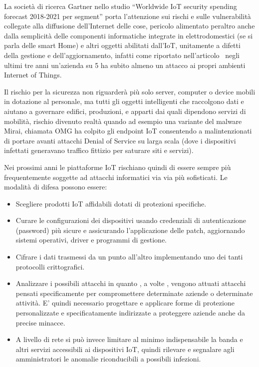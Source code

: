 La società di ricerca Gartner nello studio “Worldwide IoT security spending forecast 2018-2021 per segment” porta l’attenzione sui rischi e sulle vulnerabilità 
collegate alla diffusione dell’Internet delle cose, pericolo alimentato peraltro anche dalla semplicità delle componenti informatiche integrate in elettrodomestici (se
si parla delle smart Home) e altri oggetti abilitati dall’IoT, unitamente a difetti della gestione e dell’aggiornamento, infatti come riportato 
nell'articolo~\cite{articoloSicurezza} negli ultimi tre anni un’azienda su 5 ha subito almeno un attacco ai propri ambienti Internet of Things. 

Il rischio per la sicurezza non riguarderà più solo server, computer o device mobili in dotazione al personale, ma tutti gli oggetti intelligenti 
che raccolgono dati e aiutano a governare edifici, produzioni, e apparti dai quali dipendono servizi di mobilità, rischio divenuto realtà quando ad esempio 
una variante del malware Mirai, chiamata OMG ha colpito gli endpoint IoT consentendo a malintenzionati di portare avanti attacchi Denial of Service su 
larga scala (dove i dispositivi infettati generavano traffico fittizio per saturare siti e servizi).

Nei prossimi anni le piattaforme IoT rischiano quindi di essere sempre più frequentemente soggette ad attacchi informatici via via più sofisticati. 
Le modalità di difesa possono essere: 
\begin{itemize}
    \item Scegliere prodotti IoT affidabili dotati di protezioni specifiche.
    \item Curare le configurazioni dei dispositivi usando credenziali di autenticazione (password) più sicure
    e assicurando l’applicazione delle patch, aggiornando sistemi operativi, driver e programmi di gestione.
    \item Cifrare i dati trasmessi da un punto all'altro implementando uno dei tanti protocolli crittografici.
    \item Analizzare i possibili attacchi in quanto , a volte , vengono attuati attacchi pensati specificamente per compromettere determinate aziende o determinate 
    attività. E’ quindi necessario progettare e applicare forme di protezione personalizzate e specificatamente indirizzate a proteggere aziende anche da precise minacce.
    \item A livello di rete si può invece limitare al minimo indispensabile la banda e altri servizi accessibili ai dispositivi IoT, quindi rilevare e segnalare 
    agli amministratori le anomalie riconducibili a possibili infezioni.
\end{itemize}